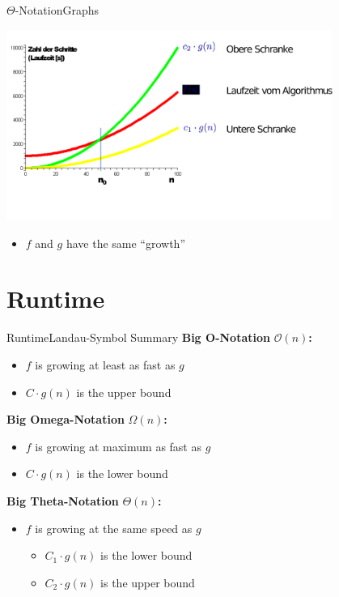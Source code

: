 \begin{frame}{$\Theta$-Notation}{Graphs}
     \begin{center}
       \includegraphics[width=0.8\textwidth]{Images/runtime-theta.pdf}
  \end{center}
  \begin{itemize}
  \item $f$ and $g$ have the same ``growth''
  \end{itemize}
\end{frame}

\section{Runtime}


\begin{frame}{Runtime}{Landau-Symbol Summary}
  \textbf{Big O-Notation} $\mathcal{O}(n)$\textbf{:}\\
    \begin{itemize}
      \item
        $f$ is growing {\color{Mittel-Blau}at least} as fast as $g$
      \item
        $C \cdot g(n)$ is the upper bound
    \end{itemize}
  \textbf{Big Omega-Notation} $\Omega(n)$\textbf{:}\\
  \begin{itemize}
    \item
      $f$ is growing {\color{Mittel-Blau}at maximum} as fast as $g$
    \item
      $C \cdot g(n)$ is the lower bound
  \end{itemize}
  \textbf{Big Theta-Notation} $\Theta(n)$\textbf{:}\\
  \begin{itemize}
    \item
      $f$ is growing at {\color{Mittel-Blau}the same} speed as $g$
      \begin{itemize}
        \item
          $C_1 \cdot g(n)$ is the lower bound
        \item
          $C_2 \cdot g(n)$ is the upper bound
      \end{itemize}
  \end{itemize}
\end{frame}

